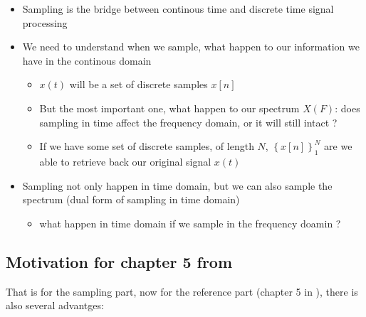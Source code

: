\begin{itemize}

\item Sampling is the bridge between continous time and discrete time signal processing

\item We need to understand when we sample, what happen to our information we have in the continous domain

	\begin{itemize}

	\item $x(t)$ will be a set of discrete samples $x[n]$
	

	\item But the most important one, what happen to our spectrum $X(F)$: does sampling in time affect the frequency domain, or it will still intact ?
	
	\item If we have some set of discrete samples, of length $N$, $\left\lbrace x[n] \right\rbrace_{1}^{N}$ are we able to retrieve back our original signal $x(t)$

	\end{itemize}
	
\item Sampling not only happen in time domain, but we can also sample the spectrum (dual form of sampling in time domain)

	\begin{itemize}
	\item what happen in time domain if we sample in the frequency doamin ?
	\end{itemize}
	
\end{itemize}


\newpage

\subsection{Motivation for chapter 5 from \cite{signal_processing_Lathi}}

That is for the sampling part, now for the reference part (chapter 5 in \cite{signal_processing_Lathi}), there is also several advantges:

